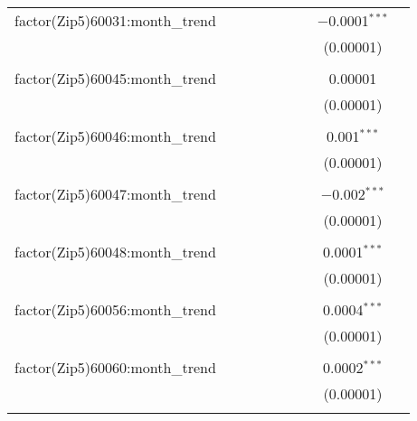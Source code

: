 \begin{table}[H]
{\begin{tabular}{@{\extracolsep{5pt}}lcccccccc}
  factor(Zip5)60031:month\_trend &  &  &  &  &  &  & $-$0.0001$^{***}$ &  \\  

   &  &  &  &  &  &  & (0.00001) &  \\  

   & & & & & & & & \\  

  factor(Zip5)60045:month\_trend &  &  &  &  &  &  & 0.00001 &  \\  

   &  &  &  &  &  &  & (0.00001) &  \\  

   & & & & & & & & \\  

  factor(Zip5)60046:month\_trend &  &  &  &  &  &  & 0.001$^{***}$ &  \\  

   &  &  &  &  &  &  & (0.00001) &  \\  

   & & & & & & & & \\  

  factor(Zip5)60047:month\_trend &  &  &  &  &  &  & $-$0.002$^{***}$ &  \\  

   &  &  &  &  &  &  & (0.00001) &  \\  

   & & & & & & & & \\  

  factor(Zip5)60048:month\_trend &  &  &  &  &  &  & 0.0001$^{***}$ &  \\  

   &  &  &  &  &  &  & (0.00001) &  \\  

   & & & & & & & & \\  

  factor(Zip5)60056:month\_trend &  &  &  &  &  &  & 0.0004$^{***}$ &  \\  

   &  &  &  &  &  &  & (0.00001) &  \\  

   & & & & & & & & \\  

  factor(Zip5)60060:month\_trend &  &  &  &  &  &  & 0.0002$^{***}$ &  \\  

   &  &  &  &  &  &  & (0.00001) &  \\  

   & & & & & & & & \\  


\end{tabular}}
\end{table}
